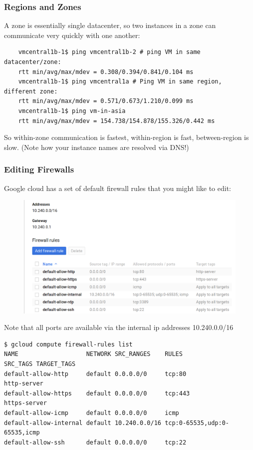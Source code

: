 \documentclass[9pt]{beamer}
\begin{document}
\begin{frame}[fragile]
  \frametitle{Regions and Zones}
  A zone is essentially single datacenter, so two instances in a zone can communicate very quickly with one another:
  \begin{verbatim}
    vmcentral1b-1$ ping vmcentral1b-2 # ping VM in same datacenter/zone:
    rtt min/avg/max/mdev = 0.308/0.394/0.841/0.104 ms
    vmcentral1b-1$ ping vmcentral1a # Ping VM in same region, different zone:
    rtt min/avg/max/mdev = 0.571/0.673/1.210/0.099 ms
    vmcentral1b-1$ ping vm-in-asia 
    rtt min/avg/max/mdev = 154.738/154.878/155.326/0.442 ms
  \end{verbatim}
  So within-zone communication is fastest, within-region is fast, between-region is slow. (Note how your instance names are resolved via DNS!)
\end{frame}

\begin{frame}[fragile]
  \frametitle{Editing Firewalls}
  Google cloud has a set of default firewall rules that you might like to edit:
  \begin{figure}
    \includegraphics[scale=0.2]{figures/DefaultFirewall.png}
  \end{figure}
\end{frame}

\begin{frame}[fragile]
Note that all ports are available via the internal ip addresses 10.240.0.0/16
  \begin{verbatim}
$ gcloud compute firewall-rules list
NAME                   NETWORK SRC_RANGES    RULES                        SRC_TAGS TARGET_TAGS
default-allow-http     default 0.0.0.0/0     tcp:80                                http-server
default-allow-https    default 0.0.0.0/0     tcp:443                               https-server
default-allow-icmp     default 0.0.0.0/0     icmp
default-allow-internal default 10.240.0.0/16 tcp:0-65535,udp:0-65535,icmp
default-allow-ssh      default 0.0.0.0/0     tcp:22    
  \end{verbatim}

\end{frame}
\end{document}
